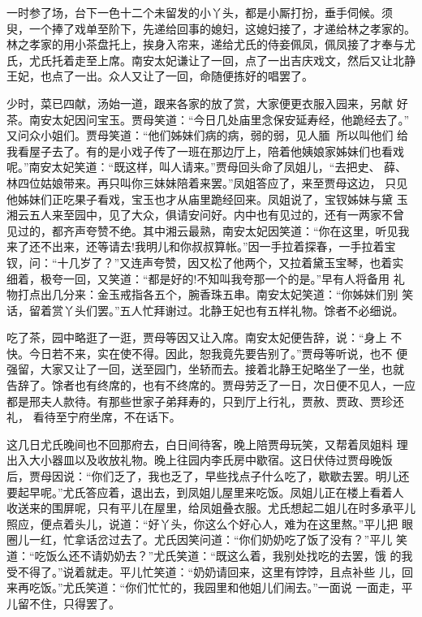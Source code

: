 一时参了场，台下一色十二个未留发的小丫头，都是小厮打扮，垂手伺候。须
臾，一个捧了戏单至阶下，先递给回事的媳妇，这媳妇接了，才递给林之孝家的。
林之孝家的用小茶盘托上，挨身入帘来，递给尤氏的侍妾佩凤，佩凤接了才奉与尤
氏，尤氏托着走至上席。南安太妃谦让了一回，点了一出吉庆戏文，然后又让北静
王妃，也点了一出。众人又让了一回，命随便拣好的唱罢了。

少时，菜已四献，汤始一道，跟来各家的放了赏，大家便更衣服入园来，另献
好茶。南安太妃因问宝玉。贾母笑道：“今日几处庙里念保安延寿经，他跪经去了。”
又问众小姐们。贾母笑道：“他们姊妹们病的病，弱的弱，见人腼，所以叫他们
给我看屋子去了。有的是小戏子传了一班在那边厅上，陪着他姨娘家姊妹们也看戏
呢。”南安太妃笑道：“既这样，叫人请来。”贾母回头命了凤姐儿，“去把史、
薛、林四位姑娘带来。再只叫你三妹妹陪着来罢。”凤姐答应了，来至贾母这边，
只见他姊妹们正吃果子看戏，宝玉也才从庙里跪经回来。凤姐说了，宝钗姊妹与黛
玉湘云五人来至园中，见了大众，俱请安问好。内中也有见过的，还有一两家不曾
见过的，都齐声夸赞不绝。其中湘云最熟，南安太妃因笑道：“你在这里，听见我
来了还不出来，还等请去!我明儿和你叔叔算帐。”因一手拉着探春，一手拉着宝
钗，问：“十几岁了？”又连声夸赞，因又松了他两个，又拉着黛玉宝琴，也着实
细着，极夸一回，又笑道：“都是好的!不知叫我夸那一个的是。”早有人将备用
礼物打点出几分来：金玉戒指各五个，腕香珠五串。南安太妃笑道：“你姊妹们别
笑话，留着赏丫头们罢。”五人忙拜谢过。北静王妃也有五样礼物。馀者不必细说。

吃了茶，园中略逛了一逛，贾母等因又让入席。南安太妃便告辞，说：“身上
不快。今日若不来，实在使不得。因此，恕我竟先要告别了。”贾母等听说，也不
便强留，大家又让了一回，送至园门，坐轿而去。接着北静王妃略坐了一坐，也就
告辞了。馀者也有终席的，也有不终席的。贾母劳乏了一日，次日便不见人，一应
都是邢夫人款待。有那些世家子弟拜寿的，只到厅上行礼，贾赦、贾政、贾珍还礼，
看待至宁府坐席，不在话下。

这几日尤氏晚间也不回那府去，白日间待客，晚上陪贾母玩笑，又帮着凤姐料
理出入大小器皿以及收放礼物。晚上往园内李氏房中歇宿。这日伏侍过贾母晚饭
后，贾母因说：“你们乏了，我也乏了，早些找点子什么吃了，歇歇去罢。明儿还
要起早呢。”尤氏答应着，退出去，到凤姐儿屋里来吃饭。凤姐儿正在楼上看着人
收送来的围屏呢，只有平儿在屋里，给凤姐叠衣服。尤氏想起二姐儿在时多承平儿
照应，便点着头儿，说道：“好丫头，你这么个好心人，难为在这里熬。”平儿把
眼圈儿一红，忙拿话岔过去了。尤氏因笑问道：“你们奶奶吃了饭了没有？”平儿
笑道：“吃饭么还不请奶奶去？”尤氏笑道：“既这么着，我别处找吃的去罢，饿
的我受不得了。”说着就走。平儿忙笑道：“奶奶请回来，这里有饽饽，且点补些
儿，回来再吃饭。”尤氏笑道：“你们忙忙的，我园里和他姐儿们闹去。”一面说
一面走，平儿留不住，只得罢了。

